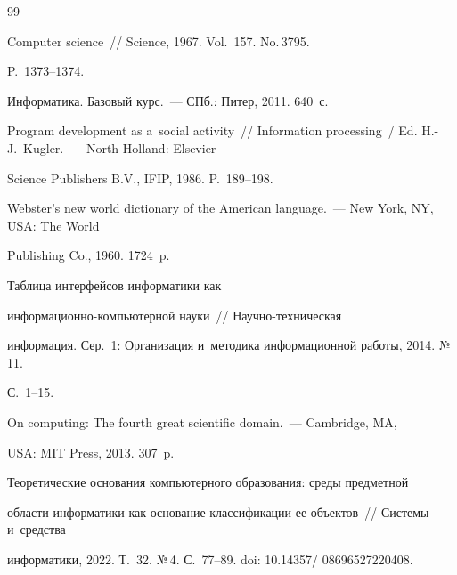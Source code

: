 {\small\frenchspacing

{\baselineskip=10.5pt


\begin{thebibliography}{99}


 Computer science~/\!\!/ Science, 1967. Vol.~157. No.\,3795. 

P.~1373--1374.


 Информатика. Базовый курс.~--- СПб.: Питер, 2011. 640~с.


 Program development as a~social activity~/\!\!/ Information processing~/ Ed. H.-J.~Kugler.~--- North Holland: Elsevier 

Science Publishers B.V., IFIP, 1986. P.~189--198.


Webster's new world dictionary of the American language.~--- New York, NY, USA: The World 

Publishing Co., 1960. 1724~p.


 Таблица интерфейсов информатики как  

ин\-фор\-ма\-ци\-он\-но-компью\-тер\-ной науки~/\!\!/ На\-уч\-но-тех\-ни\-че\-ская 

информация. Сер.~1: Организация и~методика информационной работы, 2014. №\,11. 

 С.~1--15.


 On computing: The fourth great scientific domain.~--- Cambridge, MA, 

USA: MIT Press, 2013. 307~p.




 Теоретические основания компьютерного образования: среды предметной 

области информатики как основание классификации ее объектов~/\!\!/ Системы и~средства 

информатики, 2022. Т.~32. №\,4. С.~77--89. doi: 10.14357\!/ 08696527220408.





\end{thebibliography}}}
